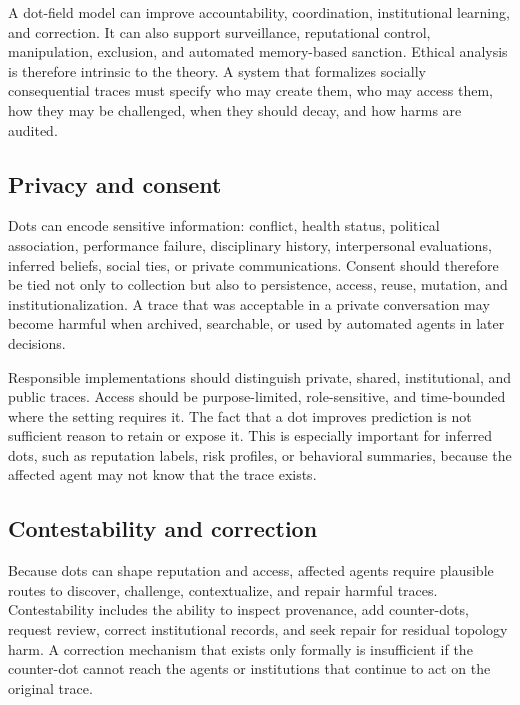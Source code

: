 \documentclass[11pt]{article}
\theoremstyle{remark}
\begin{document}
A dot-field model can improve accountability, coordination, institutional learning, and correction. It can also support surveillance, reputational control, manipulation, exclusion, and automated memory-based sanction. Ethical analysis is therefore intrinsic to the theory. A system that formalizes socially consequential traces must specify who may create them, who may access them, how they may be challenged, when they should decay, and how harms are audited.

\subsection{Privacy and consent}\label{privacy-consent}

Dots can encode sensitive information: conflict, health status, political association, performance failure, disciplinary history, interpersonal evaluations, inferred beliefs, social ties, or private communications. Consent should therefore be tied not only to collection but also to persistence, access, reuse, mutation, and institutionalization. A trace that was acceptable in a private conversation may become harmful when archived, searchable, or used by automated agents in later decisions.

Responsible implementations should distinguish private, shared, institutional, and public traces. Access should be purpose-limited, role-sensitive, and time-bounded where the setting requires it. The fact that a dot improves prediction is not sufficient reason to retain or expose it. This is especially important for inferred dots, such as reputation labels, risk profiles, or behavioral summaries, because the affected agent may not know that the trace exists.

\subsection{Contestability and correction}\label{contestability-correction}

Because dots can shape reputation and access, affected agents require plausible routes to discover, challenge, contextualize, and repair harmful traces. Contestability includes the ability to inspect provenance, add counter-dots, request review, correct institutional records, and seek repair for residual topology harm. A correction mechanism that exists only formally is insufficient if the counter-dot cannot reach the agents or institutions that continue to act on the original trace.
\end{document}
